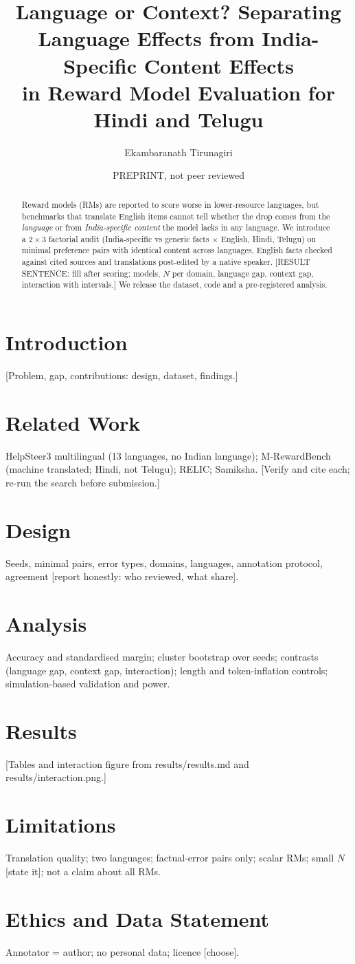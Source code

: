\documentclass[11pt]{article}
\title{Language or Context? Separating Language Effects from India-Specific Content Effects\\in Reward Model Evaluation for Hindi and Telugu}
\author{Ekambaranath Tirunagiri}
\date{PREPRINT, not peer reviewed}
\begin{document}
\maketitle
\begin{abstract}
Reward models (RMs) are reported to score worse in lower-resource languages, but benchmarks that translate English
items cannot tell whether the drop comes from the \emph{language} or from \emph{India-specific content} the model
lacks in any language. We introduce a $2\times3$ factorial audit (India-specific vs generic facts $\times$ English,
Hindi, Telugu) on minimal preference pairs with identical content across languages, English facts checked against
cited sources and translations post-edited by a native speaker. [RESULT SENTENCE: fill after scoring: models,
$N$ per domain, language gap, context gap, interaction with intervals.] We release the dataset, code and a
pre-registered analysis.
\end{abstract}
\section{Introduction} [Problem, gap, contributions: design, dataset, findings.]
\section{Related Work} HelpSteer3 multilingual (13 languages, no Indian language); M-RewardBench (machine translated; Hindi, not Telugu); RELIC; Samiksha. [Verify and cite each; re-run the search before submission.]
\section{Design} Seeds, minimal pairs, error types, domains, languages, annotation protocol, agreement [report honestly: who reviewed, what share].
\section{Analysis} Accuracy and standardised margin; cluster bootstrap over seeds; contrasts (language gap, context gap, interaction); length and token-inflation controls; simulation-based validation and power.
\section{Results} [Tables and interaction figure from results/results.md and results/interaction.png.]
\section{Limitations} Translation quality; two languages; factual-error pairs only; scalar RMs; small $N$ [state it]; not a claim about all RMs.
\section{Ethics and Data Statement} Annotator = author; no personal data; licence [choose].
\end{document}
